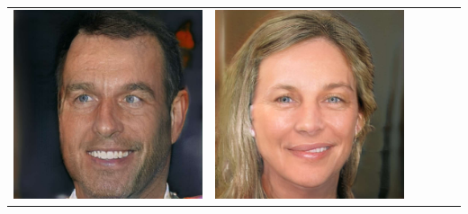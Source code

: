 \documentclass[a0,landscape]{a0poster}
\begin{document}
\begin{multicols}{3}
\begin{center}
\begin{tabular}{cc|cc|cc}
\includegraphics[width=\pganw]{../figures/pgan/58_base_iso_MH.jpg} &
\includegraphics[width=\pganw]{../figures/pgan/59_base_iso_MH.jpg} \\

\end{tabular}
\end{center}
\end{multicols}
\end{document}
